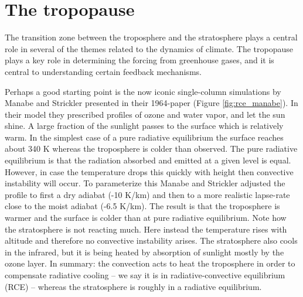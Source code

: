 \documentclass[12pt]{book}
\begin{document}
\section{The tropopause}
The transition zone between the troposphere and the stratosphere plays a central role in several of the themes related to the dynamics of climate. The tropopause plays a key role in determining the forcing from greenhouse gases, and it is central to understanding certain feedback mechanisms.

Perhaps a good starting point is the now iconic single-column simulations by Manabe and Strickler presented in their 1964-paper\citep{Manabe1964} (Figure \ref{fig:rce_manabe}). In their model they prescribed profiles of ozone and water vapor, and let the sun shine. A large fraction of the sunlight passes to the surface which is relatively warm. In the simplest case of a pure radiative equilibrium the surface reaches about 340 K whereas the troposphere is colder than observed. The pure radiative equilibrium is that the radiation absorbed and emitted at a given level is equal. However, in case the temperature drops this quickly with height then convective instability will occur. To parameterize this Manabe and Strickler adjusted the profile to first a dry adiabat (-10 K/km) and then to a more realistic lapse-rate close to the moist adiabat (-6.5 K/km). The result is that the troposphere is warmer and the surface is colder than at pure radiative equilibrium. Note how the stratosphere is not reacting much. Here instead the temperature rises with altitude and therefore no convective instability arises. The stratosphere also cools in the infrared, but it is being heated by absorption of sunlight mostly by the ozone layer. In summary: the convection acts to heat the troposphere in order to compensate radiative cooling -- we say it is in radiative-convective equilibrium (RCE) -- whereas the stratosphere is roughly in a radiative equilibrium. 
\end{document}
